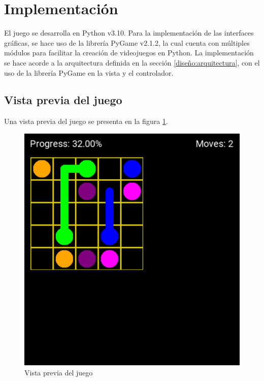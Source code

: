 \documentclass[letter,12pt]{article}
\begin{document}
\section{Implementación} \label{implementacion}

El juego se desarrolla en Python v3.10. Para la implementación de las interfaces gráficas, se hace uso de la librería PyGame v2.1.2, la cual cuenta con múltiples módulos para facilitar la creación de videojuegos en Python. La implementación se hace acorde a la arquitectura definida en la sección \ref{diseño:arquitectura}, con el uso de la librería PyGame en la vista y el controlador. \par

\subsection{Vista previa del juego} \label{implementacion:vista_previa}

Una vista previa del juego se presenta en la figura \ref{fig:vista_previa}. \par

\begin{figure}[ht!]
	\centering
	\includegraphics[scale=0.6]{img/game_preview.png}
	\caption{Vista previa del juego}
	\label{fig:vista_previa}
\end{figure}
\end{document}
